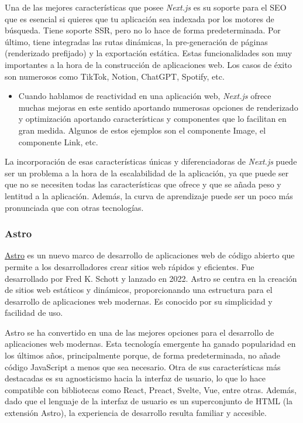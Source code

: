 Una de las mejores características que posee \textit{Next.js} es su soporte para el SEO que es esencial si quieres que tu aplicación sea indexada por los motores de búsqueda. Tiene soporte SSR, pero no lo hace de forma predeterminada. Por último, tiene integradas las rutas dinámicas, la pre-generación de páginas (renderizado prefijado) y la exportación estática. Estas funcionalidades son muy importantes a la hora de la construcción de aplicaciones web. Los casos de éxito son numerosos como TikTok, Notion, ChatGPT, Spotify, etc.

\begin{itemize}
  \item[\bien] Cuando hablamos de reactividad en una aplicación web, \textit{Next.js} ofrece muchas mejoras en este sentido aportando numerosas opciones de renderizado y optimización aportando características y componentes que lo facilitan en gran medida. Algunos de estos ejemplos son el componente Image, el componente Link, etc.
\end{itemize}

La incorporación de esas características únicas y diferenciadoras de \textit{Next.js} puede ser un problema a la hora de la escalabilidad de la aplicación, ya que puede ser que no se necesiten todas las características que ofrece y que se añada peso y lentitud a la aplicación. Además, la curva de aprendizaje puede ser un poco más pronunciada que con otras tecnologías.

\subsubsection{Astro}

\href{https://astro.build/}{Astro} es un nuevo marco de desarrollo de aplicaciones web de código abierto que permite a los desarrolladores crear sitios web rápidos y eficientes. Fue desarrollado por Fred K. Schott y lanzado en 2022. Astro se centra en la creación de sitios web estáticos y dinámicos, proporcionando una estructura para el desarrollo de aplicaciones web modernas. Es conocido por su simplicidad y facilidad de uso.

Astro se ha convertido en una de las mejores opciones para el desarrollo de aplicaciones web modernas. Esta tecnología emergente ha ganado popularidad en los últimos años, principalmente porque, de forma predeterminada, no añade código JavaScript a menos que sea necesario. Otra de sus características más destacadas es su agnosticismo hacia la interfaz de usuario, lo que lo hace compatible con bibliotecas como React, Preact, Svelte, Vue, entre otras. Además, dado que el lenguaje de la interfaz de usuario es un superconjunto de HTML (la extensión Astro), la experiencia de desarrollo resulta familiar y accesible.

